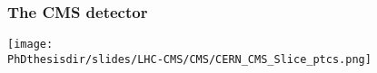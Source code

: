 \begin{frame}
\frametitle{The CMS detector}
\begin{center}
\texttt{[image: \\PhDthesisdir/slides/LHC-CMS/CMS/CERN\_CMS\_Slice\_ptcs.png]}
\end{center}
\end{frame}
